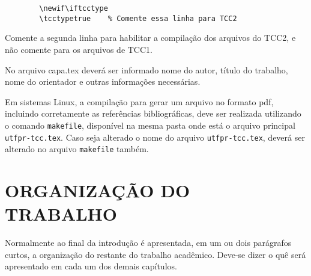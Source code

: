 \begin{verbatim}	
		\newif\iftcctype
		\tcctypetrue	% Comente essa linha para TCC2		
\end{verbatim}

\noindent Comente a segunda linha para habilitar a compilação dos arquivos do TCC2, e não comente para os arquivos de TCC1. 

No arquivo {\ttfamily capa.tex} deverá ser informado nome do autor, título do trabalho, nome do orientador e outras informações necessárias.

Em sistemas Linux, a compilação para gerar um arquivo no formato pdf, incluindo corretamente as referências bibliográficas, deve ser realizada utilizando o comando \verb|makefile|, disponível na mesma pasta onde está o arquivo principal \verb|utfpr-tcc.tex|. Caso seja alterado o nome do arquivo \verb|utfpr-tcc.tex|, deverá ser alterado no arquivo \verb|makefile| também.

\section{ORGANIZAÇÃO DO TRABALHO}
\label{sec:organizacaoTrabalho}

Normalmente ao final da introdução é apresentada, em um ou dois parágrafos curtos, a organização do restante do trabalho acadêmico.
Deve-se dizer o quê será apresentado em cada um dos demais capítulos.


